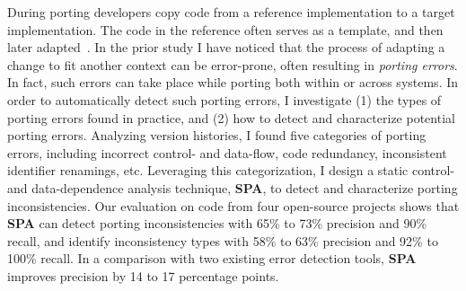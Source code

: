 \documentclass[a4paper, 11pt]{article}
\begin{document}
\begin{small}
During porting developers copy code from a reference implementation to a target implementation. 
The code in the reference often serves as a template, and then later adapted~\cite{Kim2004}.
In the prior study I have noticed that the process of adapting a change to fit another context can 
be error-prone, often resulting in {\em porting errors}. In fact, such errors can take place
while porting both within or across systems. In order to automatically detect such porting
errors, I investigate (1) the types of porting errors found in practice, and (2) how to detect and 
characterize potential porting errors. Analyzing version histories, I found five categories of 
porting errors, including incorrect control- and data-flow, code redundancy, inconsistent identifier 
renamings, etc.  Leveraging this categorization, I design a static control- and data-dependence 
analysis technique, {\sc \bf SPA}, to detect and characterize porting inconsistencies. Our evaluation 
on code from four open-source projects shows that	 {\sc \bf SPA} can detect porting inconsistencies with
  65\% to 73\% precision and 90\% recall, and identify inconsistency types with 58\% to 63\%
  precision and 92\% to 100\% recall.  In a comparison with two existing error detection tools,
  {\sc \bf SPA} improves precision by 14 to 17 percentage points.






\begin{comment}


\section*{\large Analyzing \& improving software quality}

\begin{itemize}

  \item{\textbf{Effect of programming languages on software quality.}}
A variety of debates ensue during discussions whether a given programming language is ``the
right tool for the job". While some of these debates can sometimes appear to be tinged with
almost religious fervor, most people would agree that a programming language has an effect not
only on the coding process but also on the properties of the resulting artifact. The size of
the effect can be significant and important overall, and can depend on the language properties.
Advocates of strong static typing argue that type inference will catch software bugs early.
Advocates of dynamic typing may argue that rather than spend a lot of time correcting annoying
static type errors arising from sound, conservative static type checking algorithms in
compilers, it's better to rely on strong dynamic typing to catch errors as and when they arise.
These debates, however, have largely been of the armchair variety; usually the evidence offered
in support of one position or the other tends to be anecdotal. 


\end{comment}
\end{small}
\end{document}
